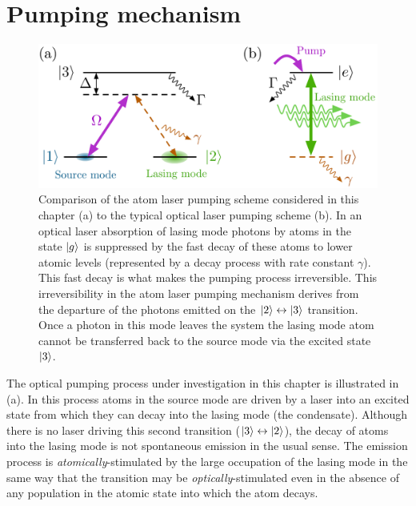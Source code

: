 \section{Pumping mechanism}
\label{OpticalPumping:PumpingMechanism}

\begin{figure}
    \centering
    \includegraphics[width=14cm]{AtomLaserVsOpticalLaser}
    \caption{Comparison of the atom laser pumping scheme considered in this chapter (a) to the typical optical laser pumping scheme (b).  In an optical laser absorption of lasing mode photons by atoms in the state ${\left|g\right>}$ is suppressed by the fast decay of these atoms to lower atomic levels (represented by a decay process with rate constant $\gamma$).  This fast decay is what makes the pumping process irreversible.  This irreversibility in the atom laser pumping mechanism derives from the departure of the photons emitted on the ${\left|2\right>} \leftrightarrow {\ensuremath{\left|3\right>}}$ transition.  Once a photon in this mode leaves the system the lasing mode atom cannot be transferred back to the source mode via the excited state ${\left|3\right>}$.\label{OpticalPumping:AtomLaserVsOpticalLaser}}
\end{figure}

The optical pumping process under investigation in this chapter is illustrated in (a).  In this process atoms in the source mode are driven by a laser into an excited state from which they can decay into the lasing mode (the condensate).  Although there is no laser driving this second transition (${\left|3\right>}\leftrightarrow{\ensuremath{\left|2\right>}}$), the decay of atoms into the lasing mode is not spontaneous emission in the usual sense.  The emission process is \emph{atomically}-stimulated by the large occupation of the lasing mode in the same way that the transition may be \emph{optically}-stimulated even in the absence of any population in the atomic state into which the atom decays.

